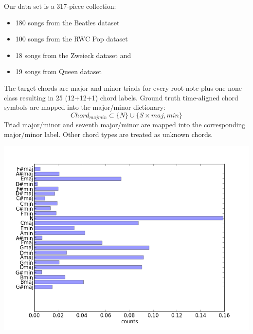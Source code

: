 \documentclass[landscape,archE1,fontscale=0.315]{baposter} %
\newcommand{\compresslist}{ %
\setlength{\itemsep}{1pt}
\setlength{\parskip}{0pt}
\setlength{\parsep}{0pt}
}
\begin{document}
\begin{poster}
{%
%
Our data set is a 317-piece collection:
\begin{itemize}\compresslist
  \item 180 songs from the Beatles dataset
  \item 100 songs from the RWC Pop dataset
  \item 18 songs from the Zweieck dataset and
  \item 19 songs from Queen dataset
\end{itemize}
The target chords are major and minor triads for every root note plus one none class resulting in 25 (12+12+1) chord labels. Ground truth time-aligned chord symbols are mapped into the major/minor dictionary:
\begin{equation*}
Chord_{majmin} \subset \{N\} \cup \{S \times {maj,min}\}
\end{equation*}
Triad major/minor and seventh major/minor are mapped into the corresponding major/minor label. Other chord
types are treated as unknown chords.
\begin{center}
\includegraphics[width=1.0\linewidth]{chordDistrib}
\end{center}

}
\end{poster}
\end{document}
